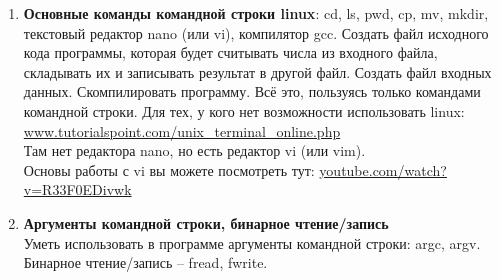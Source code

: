 \documentclass{article}
\begin{document}
\begin{enumerate}
\item \textbf{Основные команды командной строки linux}: cd, ls, pwd, cp, mv, mkdir, текстовый редактор nano (или vi), компилятор gcc. Создать файл исходного кода программы, которая будет считывать числа из входного файла, складывать их и записывать результат в другой файл. Создать файл входных данных. Скомпилировать программу. Всё это, пользуясь только командами командной строки. Для тех, у кого нет возможности использовать linux:\\
\href{https://www.tutorialspoint.com/unix_terminal_online.php}{www.tutorialspoint.com/unix\_terminal\_online.php}\\
Там нет редактора nano, но есть редактор vi (или vim). \\
Основы работы с vi вы можете посмотреть тут:
\href{https://www.youtube.com/watch?v=R33F0EDivwk}
{youtube.com/watch?v=R33F0EDivwk}

\item \textbf{Аргументы командной строки, бинарное чтение/запись} \\
Уметь использовать в программе аргументы командной строки: argc, argv. Бинарное чтение/запись -- fread, fwrite.\\
\end{enumerate}
\end{document}
